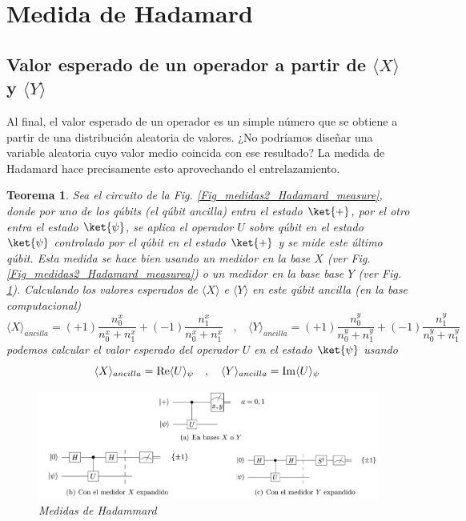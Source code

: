 \documentclass[a4paper,11pt]{book} %
\newtheorem{teorema_contador}{Teorema}
\newcommand{\Teorema}[1]{
		\begin{mybox_gray2}{}
			\begin{teorema_contador}
				 #1 
			\end{teorema_contador} 
		\end{mybox_gray2}
	}
\numberwithin{equation}{chapter}
\begin{document}
    \section{Medida de Hadamard}
    
    	\subsection{Valor esperado de un operador a partir de $\langle X \rangle$ y $\langle Y\rangle$}

Al final, el valor esperado de un operador es un simple número que se obtiene a partir de una distribución aleatoria de valores. 
¿No podríamos diseñar una variable aleatoria cuyo valor medio coincida con ese resultado? 
La medida de Hadamard hace precisamente esto aprovechando el entrelazamiento.


	\Teorema{
	Sea el circuito de la Fig. \ref{Fig_medidas2_Hadamard_measure}, donde por uno de los qúbits (el qúbit ancilla) entra el estado $\ket{+}$, por el otro entra el estado $\ket{\psi}$, se aplica el operador $U$ sobre qúbit en el estado $\ket{\psi}$ controlado por el qúbit en el estado $\ket{+}$ y se mide este último qúbit. Esta medida se hace bien usando un medidor en la base $X$ (ver Fig. \ref{Fig_medidas2_Hadamard_measurea}) o un medidor en la base base $Y$ (ver Fig. \ref{Fig_medidas2_Hadamard_measureb}). Calculando los valores esperados de $\langle X \rangle $ e $\langle Y \rangle$ en este qúbit ancilla (en la base computacional)
	\begin{equation}
	\langle X \rangle_{ancilla} = (+1) \frac{n^x_0}{n_0^x+n_1^x} + (-1) \frac{n^x_1}{n^x_0+n^x_1} ~~~~, ~~~~
	\langle Y \rangle_{ancilla} = (+1) \frac{n^y_0}{n^y_0+n^y_1} + (-1) \frac{n^y_1}{n^y_0+n^y_1}
	\end{equation}	
podemos calcular el valor esperado del operador $U$ en el estado $\ket{\psi}$ usando
	\begin{equation}
	\langle X\rangle_{ancilla} = {\rm Re} \langle U\rangle_{\psi} ~~~,~~~ \langle Y\rangle_{ancilla} = {\rm Im} \langle U\rangle_{\psi}\, 
	\end{equation}

		\begin{figure}[H]
		\centering 
		\includegraphics[width=0.8\linewidth]{Figuras/Fig_subfig_medidas2_Hadamard_measure.png}
		\caption{Medidas de Hadammard}
		\label{Fig_medidas2_Hadamard_measure}
		\label{Fig_medidas2_Hadamard_measurea}
		\label{Fig_medidas2_Hadamard_measureb}
		\end{figure}
	}
\end{document}
